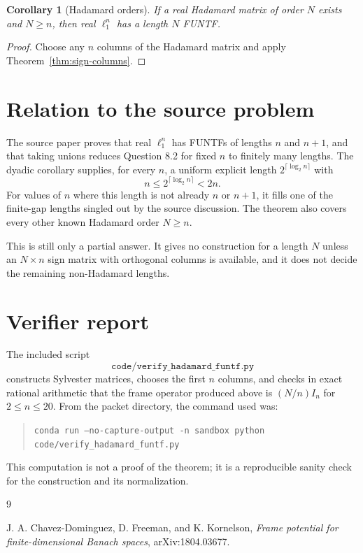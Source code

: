 \documentclass[11pt]{article}
\newtheorem{corollary}{Corollary}
\begin{document}
\begin{corollary}[Hadamard orders]
If a real Hadamard matrix of order $N$ exists and $N\ge n$, then real
$\ell_1^n$ has a length $N$ FUNTF.
\end{corollary}

\begin{proof}
Choose any $n$ columns of the Hadamard matrix and apply
Theorem~\ref{thm:sign-columns}.
\end{proof}

\section*{Relation to the source problem}

The source paper proves that real $\ell_1^n$ has FUNTFs of lengths $n$ and
$n+1$, and that taking unions reduces Question 8.2 for fixed $n$ to finitely
many lengths. The dyadic corollary supplies, for every $n$, a uniform explicit
length $2^{\lceil \log_2 n\rceil}$ with
\[
  n \le 2^{\lceil \log_2 n\rceil} < 2n.
\]
For values of $n$ where this length is not already $n$ or $n+1$, it fills one
of the finite-gap lengths singled out by the source discussion. The theorem
also covers every other known Hadamard order $N \ge n$.

This is still only a partial answer. It gives no construction for a length
$N$ unless an $N\times n$ sign matrix with orthogonal columns is available,
and it does not decide the remaining non-Hadamard lengths.

\section*{Verifier report}

The included script
\[
\texttt{code/verify\_hadamard\_funtf.py}
\]
constructs Sylvester matrices, chooses the first $n$ columns, and checks in
exact rational arithmetic that the frame operator produced above is
$(N/n)I_n$ for $2 \le n \le 20$. From the packet directory, the command used
was:
\begin{quote}\small
\texttt{conda run --no-capture-output -n sandbox python}\\
\texttt{code/verify\_hadamard\_funtf.py}
\end{quote}
This computation is not a proof of the theorem; it is a reproducible sanity
check for the construction and its normalization.

\begin{thebibliography}{9}

J. A. Chavez-Dominguez, D. Freeman, and K. Kornelson,
\emph{Frame potential for finite-dimensional Banach spaces},
arXiv:1804.03677.

\end{thebibliography}
\end{document}
